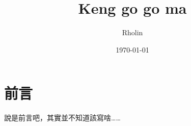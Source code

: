 \documentclass{article}
\title{Keng go go ma}
\author{Rholin}
\date{\today}
\begin{document}
\maketitle

\section{前言}
說是前言吧，其實並不知道該寫啥……
\end{document}
